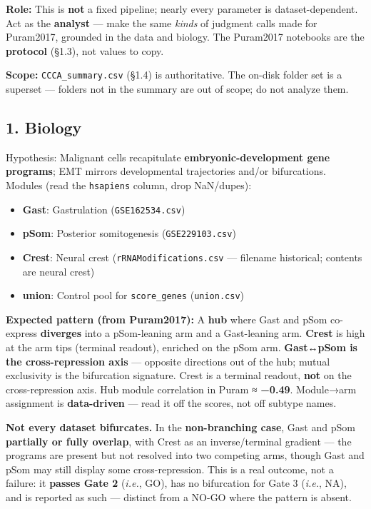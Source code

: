 \documentclass[11pt,a4paper]{article}
\providecommand{\tightlist}{\setlength{\itemsep}{0pt}\setlength{\parskip}{0pt}}
\begin{document}
\textbf{Role:} This is \textbf{not} a fixed pipeline; nearly every
parameter is dataset-dependent. Act as the \textbf{analyst} --- make the
same \emph{kinds} of judgment calls made for Puram2017, grounded in the
data and biology. The Puram2017 notebooks are the \textbf{protocol}
(§1.3), not values to copy.

\textbf{Scope:} \texttt{CCCA\_summary.csv} (§1.4) is authoritative. The
on-disk folder set is a superset --- folders not in the summary are out
of scope; do not analyze them.

\hypertarget{biology}{%
\subsection{1. Biology}\label{biology}}

Hypothesis: Malignant cells recapitulate \textbf{embryonic-development
gene programs}; EMT mirrors developmental trajectories and/or
bifurcations. Modules (read the \texttt{hsapiens} column, drop
NaN/dupes):

\begin{itemize}
\tightlist
\item
  \textbf{Gast}: Gastrulation (\texttt{GSE162534.csv})
\item
  \textbf{pSom}: Posterior somitogenesis (\texttt{GSE229103.csv})
\item
  \textbf{Crest}: Neural crest (\texttt{rRNAModifications.csv} ---
  filename historical; contents are neural crest)
\item
  \textbf{union}: Control pool for \texttt{score\_genes}
  (\texttt{union.csv})
\end{itemize}

\textbf{Expected pattern (from Puram2017):} A \textbf{hub} where
Gast and pSom co-express \textbf{diverges} into a pSom-leaning arm and a
Gast-leaning arm. \textbf{Crest} is high at the arm tips (terminal
readout), enriched on the pSom arm. \textbf{Gast↔pSom is the
cross-repression axis} --- opposite directions out of the hub; mutual
exclusivity is the bifurcation signature. Crest is a terminal readout,
\textbf{not} on the cross-repression axis. Hub module correlation in
Puram ≈ \textbf{−0.49}. Module→arm assignment is \textbf{data-driven}
--- read it off the scores, not off subtype names.

\textbf{Not every dataset bifurcates.} In the \textbf{non-branching
case}, Gast and pSom \textbf{partially or fully overlap}, with Crest as
an inverse/terminal gradient --- the programs are present but not
resolved into two competing arms, though Gast and pSom may still display
some cross-repression. This is a real outcome, not a failure: it
\textbf{passes Gate 2} (\emph{i.e.}, GO), has no bifurcation for Gate 3
(\emph{i.e.}, NA), and is reported as such --- distinct from a NO-GO
where the pattern is absent.
\end{document}
